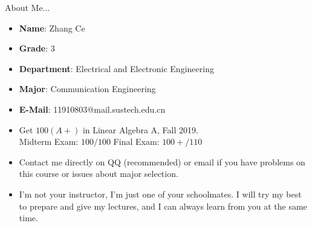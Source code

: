 \documentclass{beamer}
\begin{document}
\begin{frame}{About Me...}
\begin{itemize}
    \item \textbf{Name}: Zhang Ce
    \item \textbf{Grade}: 3
    \item \textbf{Department}: Electrical and Electronic Engineering
    \item \textbf{Major}: Communication Engineering
    \item \textbf{E-Mail}: 11910803@mail.sustech.edu.cn
    \item Get $100 (A+)$ in Linear Algebra A, Fall 2019. \\
    \vspace{3pt}
    Midterm Exam: $100/100$ \qquad Final Exam: $100+/110$
    \item Contact me directly on QQ (recommended) or email if you have problems on this course or issues about major selection.
    \item I'm not your instructor, I'm just one of your schoolmates. I will try my best to prepare and give my lectures, and I can always learn from you at the same time.
\end{itemize}

\end{frame}
\end{document}
